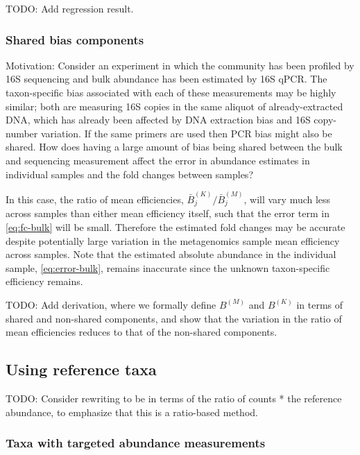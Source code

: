 \documentclass[
]{article}
\theoremstyle{definition}
\theoremstyle{definition}
\theoremstyle{definition}
\theoremstyle{definition}
\theoremstyle{remark}
\begin{document}
TODO: Add regression result.

\hypertarget{shared-bias-components}{%
\subsubsection{Shared bias components}\label{shared-bias-components}}

Motivation: Consider an experiment in which the community has been profiled by 16S sequencing and bulk abundance has been estimated by 16S qPCR.
The taxon-specific bias associated with each of these measurements may be highly similar; both are measuring 16S copies in the same aliquot of already-extracted DNA, which has already been affected by DNA extraction bias and 16S copy-number variation.
If the same primers are used then PCR bias might also be shared.
How does having a large amount of bias being shared between the bulk and sequencing measurement affect the error in abundance estimates in individual samples and the fold changes between samples?

In this case, the ratio of mean efficiencies, \(\bar B^{(K)}_j / \bar B^{(M)}_j\), will vary much less across samples than either mean efficiency itself, such that the error term in \eqref{eq:fc-bulk} will be small.
Therefore the estimated fold changes may be accurate despite potentially large variation in the metagenomics sample mean efficiency across samples.
Note that the estimated absolute abundance in the individual sample, \eqref{eq:error-bulk}, remains inaccurate since the unknown taxon-specific efficiency remains.

TODO: Add derivation, where we formally define \(B^{(M)}\) and \(B^{(K)}\) in terms of shared and non-shared components, and show that the variation in the ratio of mean efficiencies reduces to that of the non-shared components.

\hypertarget{using-reference-taxa}{%
\subsection{Using reference taxa}\label{using-reference-taxa}}

TODO: Consider rewriting to be in terms of the ratio of counts * the reference abundance, to emphasize that this is a ratio-based method.

\hypertarget{taxa-with-targeted-abundance-measurements}{%
\subsubsection{Taxa with targeted abundance measurements}\label{taxa-with-targeted-abundance-measurements}}
\end{document}
